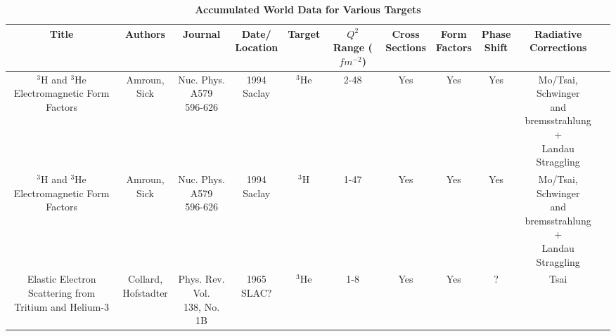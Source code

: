 \begin{landscape}
\pagestyle{empty}
\topmargin 2.75cm
\oddsidemargin 0.5cm
\evensidemargin 0.5cm
\textwidth 16cm 
\textheight 21cm

\begin{longtable}{c c c c c c c c c c c}%
\caption{\bf{Accumulated World Data for Various Targets}}\\
\hline
\hline
\textbf{Title} & \textbf{Authors} & \textbf{Journal} & \thead{Date/\\Location} & \textbf{Target} & \thead{$Q^2$ Range \\ ($fm^{-2}$)} & \thead{Cross \\ Sections} & \thead{Form \\ Factors} & \thead{Phase \\ Shift} & \thead{Radiative \\ Corrections} \\
\hline

\thead{$^3$H and $^3$He \\ Electromagnetic \\ Form Factors} & \makecell{Amroun,\\ Sick} & \makecell{Nuc. Phys. A579 \\ 596-626} & \makecell{1994\\Saclay} & $^3$He & 2-48 & Yes & Yes & Yes & \makecell{Mo/Tsai, Schwinger \\ and bremsstrahlung +\\ Landau Straggling} \\

\thead{$^3$H and $^3$He \\ Electromagnetic \\ Form Factors} & \makecell{Amroun,\\ Sick} & \makecell{Nuc. Phys. A579 \\ 596-626} & \makecell{1994\\Saclay} & $^3$H & 1-47 & Yes & Yes & Yes & \makecell{Mo/Tsai, Schwinger \\ and bremsstrahlung +\\ Landau Straggling} \\

\thead{Elastic Electron \\ Scattering from \\Tritium and Helium-3} & \makecell{Collard,\\ Hofstadter} & \makecell{Phys. Rev. Vol.\\ 138, No. 1B} & \makecell{1965\\SLAC?} & $^3$He & 1-8 & Yes & Yes & ? & Tsai \\


\end{longtable}
\end{landscape}
